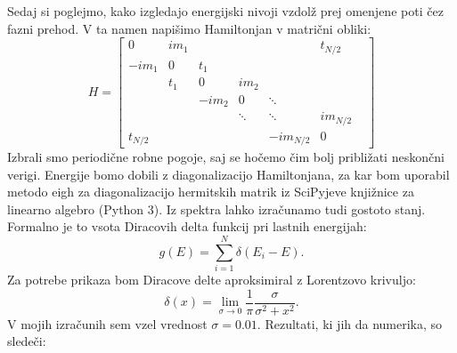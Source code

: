 Sedaj si poglejmo, kako izgledajo energijski nivoji vzdolž prej omenjene poti čez fazni prehod. 
V ta namen napišimo Hamiltonjan v matrični obliki:
\[
H = \begin{bmatrix} 
0 & i m_1 &  &  &  & t_{N/2}\\
-i m_1 & 0 & t_1 &  & &  \\
 & t_1 & 0 & im_2 &  &  \\
 &  & -im_2 & 0& \ddots&  & \\
 &  &  & \ddots & \ddots & im_{N/2}  \\
t_{N/2} & & &  & -i m_{N/2} & 0  
    \end{bmatrix}
\]
Izbrali smo periodične robne pogoje, saj se hočemo čim bolj približati neskončni verigi. Energije bomo dobili z diagonalizacijo Hamiltonjana, za kar bom uporabil metodo eigh za diagonalizacijo hermitskih matrik iz SciPyjeve knjižnice za linearno algebro (Python 3).
Iz spektra lahko izračunamo tudi gostoto stanj. Formalno je to vsota Diracovih delta funkcij pri lastnih energijah:
\begin{equation}
g(E) = \sum_{i=1}^N \delta (E_i - E).
\end{equation}
Za potrebe prikaza bom Diracove delte aproksimiral z Lorentzovo krivuljo:
\begin{equation}
\delta (x) = \lim_{\sigma \to 0} \frac{1}{\pi} \frac{\sigma}{\sigma^2 + x^2}.
\end{equation}
V mojih izračunih sem vzel vrednost $\sigma=0.01$.
Rezultati, ki jih da numerika, so sledeči:
